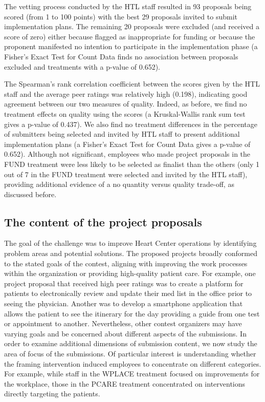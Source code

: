 \documentclass[11pt, titlepage]{article}
\begin{document}
The vetting process conducted by the HTL staff resulted in 93 proposals
being scored (from 1 to 100 points) with the best 29 proposals invited
to submit implementation plans. The remaining 20 proposals were excluded
(and received a score of zero) either because flagged as inappropriate
for funding or because the proponent manifested no intention to
participate in the implementation phase (a Fisher's Exact Test for Count
Data finds no association between proposals excluded and treatments with
a p-value of 0.652).

The Spearman's rank correlation coefficient between the scores given by
the HTL staff and the average peer ratings was relatively high (0.198),
indicating good agreement between our two measures of quality. Indeed,
as before, we find no treatment effects on quality using the scores (a
Kruskal-Wallis rank sum test gives a p-value of 0.437). We also find no
treatment differences in the percentage of submitters being selected and
invited by HTL staff to present additional implementation plans (a
Fisher's Exact Test for Count Data gives a p-value of 0.652). Although
not significant, employees who made project proposals in the FUND
treatment were less likely to be selected as finalist than the others
(only 1 out of 7 in the FUND treatment were selected and invited by the
HTL staff), providing additional evidence of a no quantity versus
quality trade-off, as discussed before.

\subsection{The content of the project
proposals}\label{the-content-of-the-project-proposals}

The goal of the challenge was to improve Heart Center operations by
identifying problem areas and potential solutions. The proposed projects
broadly conformed to the stated goals of the contest, aligning with
improving the work processes within the organization or providing
high-quality patient care. For example, one project proposal that
received high peer ratings was to create a platform for patients to
electronically review and update their med list in the office prior to
seeing the physician. Another was to develop a smartphone application
that allows the patient to see the itinerary for the day providing a
guide from one test or appointment to another. Nevertheless, other
contest organizers may have varying goals and be concerned about
different aspects of the submissions. In order to examine additional
dimensions of submission content, we now study the area of focus of the
submissions. Of particular interest is understanding whether the framing
intervention induced employees to concentrate on different categories.
For example, while staff in the WPLACE treatment focused on improvements
for the workplace, those in the PCARE treatment concentrated on
interventions directly targeting the patients.
\end{document}
